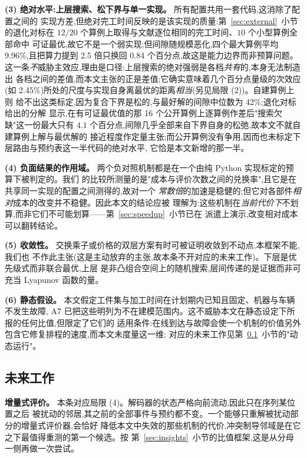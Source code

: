\documentclass[manuscript,screen,review]{acmart}
\newcommand{\GainProbeLoop}{2.45\%}      %
\newcommand{\LBGapMed}{42\%}
\newcommand{\PubNInst}{20}
\newcommand{\PubNOpt}{16}                 %
\newcommand{\PubNMatch}{12}               %
\newcommand{\PubGapBig}{9.96\%}           %
\newcommand{\PubBudgetRatio}{2.5}
\newcommand{\PubBudgetGainPP}{0.84}       %
\newcommand{\PubLBResidMax}{4.1}          %
\begin{document}
\textbf{(3) 绝对水平:上层搜索、松下界与单一实现。} 所有配置共用一套代码,这消除了配置之间的
实现方差,但绝对完工时间反映的是该实现的质量:第~\ref{sec:external}~小节的退化对标在
$\PubNMatch{}/\PubNInst{}$ 个算例上取得与文献逐位相同的完工时间、$10$ 个小型算例全部命中
可证最优,故它不是一个弱实现;但间隙随规模恶化,四个最大算例平均 \PubGapBig{},且把算力提到
\PubBudgetRatio{} 倍只换回 $\PubBudgetGainPP$ 个百分点,故这是能力边界而非预算问题。
这一条\emph{不}威胁主效应,理由是口径:上层搜索的绝对强弱是各档\emph{共有}的,本身无法制造出
各档之间的差值,而本文主张的正是差值;它确实意味着几个百分点量级的次效应(如
\GainProbeLoop{})所处的尺度与实现自身离最优的距离\emph{相当}(另见局限 (2))。自建算例上则
给不出这类标定,因为复合下界是松的,与最好解的间隙中位数为 \LBGapMed{};退化对标给出的分解
显示,在有可证最优值的那 \PubNOpt{} 个公开算例上逐算例作差后"搜索欠缺"这一份最大只有
$\PubLBResidMax$ 个百分点,间隙几乎全部来自下界自身的松弛,故本文不就自建算例上解与最优解的
接近程度作定量主张;而公开算例没有争用,因而也未标定下层路由与预约表这一半代码的绝对水平,
它恰是本文新增的那一半。

\textbf{(4) 负面结果的作用域。} 两个负对照机制都是在一个由纯 Python 实现标定的预算下被判定的。我们
的比较所测量的是"成本与评价次数之间的兑换率",且它是在共享同一实现的配置之间测得的,故对一个
\emph{常数倍}的加速是稳健的;但它对各部件\emph{相对}成本的改变并不稳健。因此本文的结论应被
理解为:这些机制在\emph{当前代价下}不划算,而非它们不可能划算——第~\ref{sec:speedup}~小节已在
派遣上演示,改变相对成本可以翻转结论。

\textbf{(5) 收敛性。} 交换乘子或价格的双层方案有时可被证明收敛到不动点,本框架不能,我们也
不作此主张(这是主动放弃的主张,故本条不开对应的未来工作)。下层是优先级式而非联合最优,上层
是非凸组合空间上的随机搜索,层间传递的是证据而非可充当 Lyapunov 函数的量。

\textbf{(6) 静态假设。} 本文假定工件集与加工时间在计划期内已知且固定、机器与车辆不发生故障,
A7 已把这些明列为不在建模范围内。这不威胁本文在静态设定下所报的任何比值,但限定了它们的
适用条件:在线到达与故障会使一个机制的价值另外包含它修复排程的速度,而本文未度量这一维;
对应的未来工作见第~\ref{sec:future_work}~小节的"动态运行"。

\subsection{未来工作}
\label{sec:future_work}

\textbf{增量式评价。} 本条对应局限 (4)。解码器的状态严格向前流动,因此只在序列某位置之后
被扰动的邻居,其之前的全部事件与预约都不变。一个能够只重解被扰动部分的增量式评价器,会恰好
降低本文中失效的那些机制的代价,冲突制导邻域是在它之下最值得重测的第一个候选。按
第~\ref{sec:insights}~小节的比值框架,这是从分母一侧再做一次尝试。
\end{document}

